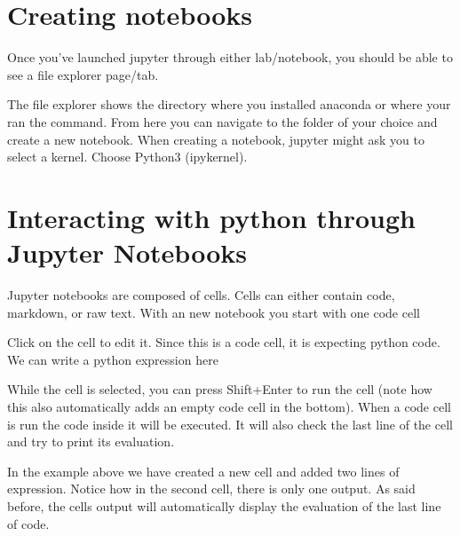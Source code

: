 \documentclass[letterpaper,10pt,english]{jupyterBook}
\begin{document}
\section{Creating notebooks}
\label{\detokenize{jupyter-notebooks:creating-notebooks}}
\sphinxAtStartPar
Once you’ve launched jupyter through either lab/notebook, you should be able to see a file explorer page/tab.

\sphinxAtStartPar
{}

\sphinxAtStartPar
{}

\sphinxAtStartPar
The file explorer shows the directory where you installed anaconda or where your ran the command. From here you can navigate to the folder of your choice and create a new notebook. When creating a notebook, jupyter might ask you to select a kernel. Choose Python3 (ipykernel).


\section{Interacting with python through Jupyter Notebooks}
\label{\detokenize{jupyter-notebooks:interacting-with-python-through-jupyter-notebooks}}
\sphinxAtStartPar
Jupyter notebooks are composed of cells. Cells can either contain code, markdown, or raw text. With an new notebook you start with one code cell

\sphinxAtStartPar
{}

\sphinxAtStartPar
Click on the cell to edit it. Since this is a code cell, it is expecting python code.
We can write a python expression here

\sphinxAtStartPar
{}

\sphinxAtStartPar
While the cell is selected, you can press Shift+Enter to run the cell (note how this also automatically adds an empty code cell in the bottom). When a code cell is run the code inside it will be executed. It will also check the last line of the cell and try to print its evaluation.

\sphinxAtStartPar
{}

\sphinxAtStartPar
In the example above we have created a new cell and added two lines of expression. Notice how in the second cell, there is only one output. As said before, the cells output will automatically display the evaluation of the last line of code.
\end{document}
